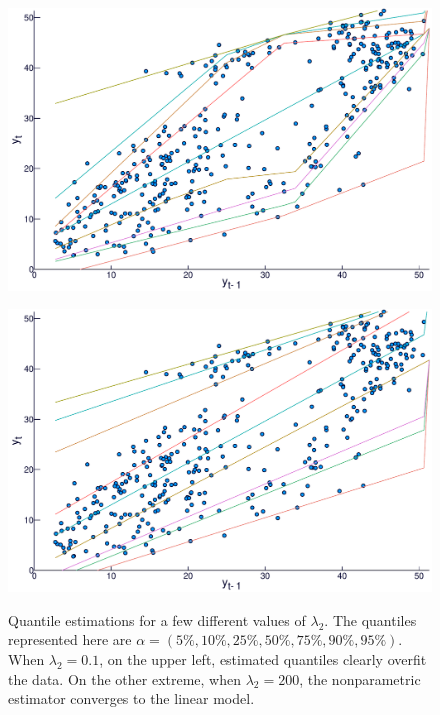 \begin{figure}[htp]
\begin{minipage}[t]{0.4\linewidth}
\begin{minipage}[b]{\linewidth}
      \centering     \includegraphics[width=\textwidth]{Images/icaraizinho-crossing-10}
    \end{minipage}
     \begin{minipage}[b]{\linewidth}
      \centering     \includegraphics[width=\textwidth]{Images/icaraizinho-crossing-200}
      \label{fig:npqar-cross}
     \end{minipage}
  \end{minipage}
  \caption{Quantile estimations for a few different values of $\lambda_2$. The quantiles represented here are $\alpha = (5\%, 10\%, 25\%, 50\%, 75\%, 90\%, 95\%)$. When $\lambda_2 = 0.1$, on the upper left, estimated quantiles clearly overfit the data. On the other extreme, when $\lambda_2=200$, the nonparametric estimator converges to the linear model.}
  \label{fig:npqar-results}
\end{figure}

